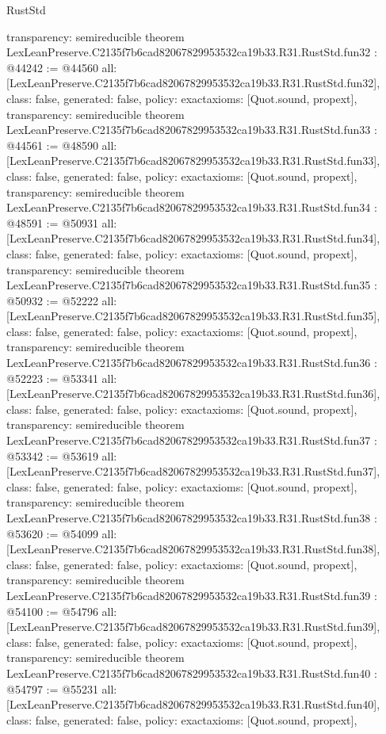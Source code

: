 \begin{lexlean}{RustStd}
\begin{coremodule}
{  transparency: semireducible
}
theorem LexLeanPreserve.C2135f7b6cad82067829953532ca19b33.R31.RustStd.fun32 : @44242 := @44560 {
  all: [LexLeanPreserve.C2135f7b6cad82067829953532ca19b33.R31.RustStd.fun32],
  class: false,
  generated: false,
  policy: exact{axioms: [Quot.sound, propext]},
  transparency: semireducible
}
theorem LexLeanPreserve.C2135f7b6cad82067829953532ca19b33.R31.RustStd.fun33 : @44561 := @48590 {
  all: [LexLeanPreserve.C2135f7b6cad82067829953532ca19b33.R31.RustStd.fun33],
  class: false,
  generated: false,
  policy: exact{axioms: [Quot.sound, propext]},
  transparency: semireducible
}
theorem LexLeanPreserve.C2135f7b6cad82067829953532ca19b33.R31.RustStd.fun34 : @48591 := @50931 {
  all: [LexLeanPreserve.C2135f7b6cad82067829953532ca19b33.R31.RustStd.fun34],
  class: false,
  generated: false,
  policy: exact{axioms: [Quot.sound, propext]},
  transparency: semireducible
}
theorem LexLeanPreserve.C2135f7b6cad82067829953532ca19b33.R31.RustStd.fun35 : @50932 := @52222 {
  all: [LexLeanPreserve.C2135f7b6cad82067829953532ca19b33.R31.RustStd.fun35],
  class: false,
  generated: false,
  policy: exact{axioms: [Quot.sound, propext]},
  transparency: semireducible
}
theorem LexLeanPreserve.C2135f7b6cad82067829953532ca19b33.R31.RustStd.fun36 : @52223 := @53341 {
  all: [LexLeanPreserve.C2135f7b6cad82067829953532ca19b33.R31.RustStd.fun36],
  class: false,
  generated: false,
  policy: exact{axioms: [Quot.sound, propext]},
  transparency: semireducible
}
theorem LexLeanPreserve.C2135f7b6cad82067829953532ca19b33.R31.RustStd.fun37 : @53342 := @53619 {
  all: [LexLeanPreserve.C2135f7b6cad82067829953532ca19b33.R31.RustStd.fun37],
  class: false,
  generated: false,
  policy: exact{axioms: [Quot.sound, propext]},
  transparency: semireducible
}
theorem LexLeanPreserve.C2135f7b6cad82067829953532ca19b33.R31.RustStd.fun38 : @53620 := @54099 {
  all: [LexLeanPreserve.C2135f7b6cad82067829953532ca19b33.R31.RustStd.fun38],
  class: false,
  generated: false,
  policy: exact{axioms: [Quot.sound, propext]},
  transparency: semireducible
}
theorem LexLeanPreserve.C2135f7b6cad82067829953532ca19b33.R31.RustStd.fun39 : @54100 := @54796 {
  all: [LexLeanPreserve.C2135f7b6cad82067829953532ca19b33.R31.RustStd.fun39],
  class: false,
  generated: false,
  policy: exact{axioms: [Quot.sound, propext]},
  transparency: semireducible
}
theorem LexLeanPreserve.C2135f7b6cad82067829953532ca19b33.R31.RustStd.fun40 : @54797 := @55231 {
  all: [LexLeanPreserve.C2135f7b6cad82067829953532ca19b33.R31.RustStd.fun40],
  class: false,
  generated: false,
  policy: exact{axioms: [Quot.sound, propext]},
}
\end{coremodule}
\end{lexlean}
